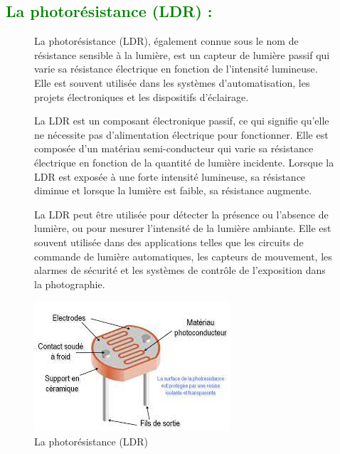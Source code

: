\begin{flushleft}
	\subsection{\textcolor{green}{La photorésistance (LDR) :}}
		\begin{figure}[h]
			\begin{minipage}{0.6\textwidth}
				La photorésistance (LDR), également connue sous le nom de résistance sensible à la lumière, est un capteur de lumière passif qui varie sa résistance électrique en fonction de l'intensité lumineuse. Elle est souvent utilisée dans les systèmes d'automatisation, les projets électroniques et les dispositifs d'éclairage.
				
				La LDR est un composant électronique passif, ce qui signifie qu'elle ne nécessite pas d'alimentation électrique pour fonctionner. Elle est composée d'un matériau semi-conducteur qui varie sa résistance électrique en fonction de la quantité de lumière incidente. Lorsque la LDR est exposée à une forte intensité lumineuse, sa résistance diminue et lorsque la lumière est faible, sa résistance augmente.
				
				La LDR peut être utilisée pour détecter la présence ou l'absence de lumière, ou pour mesurer l'intensité de la lumière ambiante. Elle est souvent utilisée dans des applications telles que les circuits de commande de lumière automatiques, les capteurs de mouvement, les alarmes de sécurité et les systèmes de contrôle de l'exposition dans la photographie.
			\end{minipage}
			\begin{minipage}{0.4\textwidth}
				\centering
				\includegraphics[width=\textwidth]{chapitres/images/ldr.jpg}
				\caption{La photorésistance (LDR)}
				\label{fig:votre_image}
			\end{minipage}
		\end{figure}

\end{flushleft}
